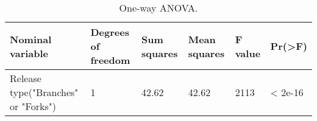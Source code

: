 \begin{table}[H]
\caption{One-way ANOVA.}
\label{table:ch4_rq1_anova} 
\centering
\begin{tabu} to 
  \toprule
  Nominal variable & Degrees of freedom & Sum squares & Mean squares & F value & Pr(>F) \\
  \midrule
  Release type("Branches" or "Forks") & 1 & 42.62 & 42.62 & 2113 & < 2e-16 \\
  \bottomrule
\end{tabu}
\end{table}
